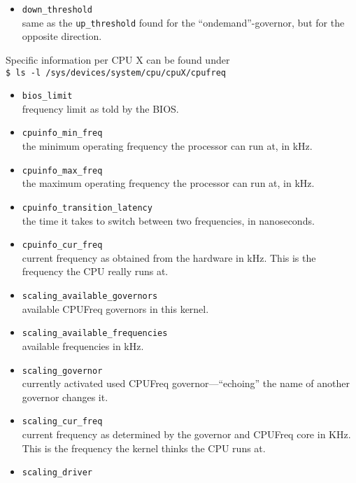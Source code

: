 \begin{description}
\begin{multicols}{2}
\begin{itemize}
\item \lstinline!down_threshold!\\
	same as the \lstinline!up_threshold! found for the ``ondemand''-governor, but for the opposite direction.
\end{itemize}
\end{multicols}
%
\end{description}
%

\newpage
\noindent
Specific information per CPU X can be found under\\[1em]
%
\noindent
\lstinline!$ ls -l /sys/devices/system/cpu/cpuX/cpufreq!
%
\begin{multicols}{2}
\begin{itemize}
\renewcommand{\labelitemi}{\drsh}
\item \lstinline!bios_limit!\\
	frequency limit as told by the BIOS.
\item \lstinline!cpuinfo_min_freq!\\
	the minimum operating frequency the processor can run at, in kHz.
\item \lstinline!cpuinfo_max_freq!\\
	the maximum operating frequency the processor can run at, in kHz. 
\item \lstinline!cpuinfo_transition_latency!\\
	the time it takes to switch between two frequencies, in nanoseconds.
\item \lstinline!cpuinfo_cur_freq!\\
	current frequency as obtained from the hardware in kHz. This is the frequency the CPU really runs at.
\item \lstinline!scaling_available_governors!\\
	available CPUFreq governors in this kernel. 
\item \lstinline!scaling_available_frequencies!\\
	available frequencies in kHz.
\item \lstinline!scaling_governor!\\
	currently activated used CPUFreq governor---``echoing'' the name of another governor changes it.
\item \lstinline!scaling_cur_freq!\\
	current frequency as determined by the governor and CPUFreq core in KHz. This is the frequency the kernel thinks the CPU runs at.
\item \lstinline!scaling_driver!\\

\end{itemize}
\end{multicols}
